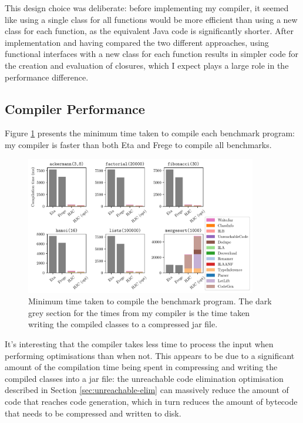 \documentclass[dissertation.tex]{subfiles}
\begin{document}
{{        This design choice was deliberate: before implementing my compiler, it seemed like using a single class for all
        functions would be more efficient than using a new class for each function, as the equivalent Java code is
        significantly shorter. After implementation and having compared the two different approaches, using functional
        interfaces with a new class for each function results in simpler code for the creation and evaluation of
        closures, which I expect plays a large role in the performance difference.


    }
    \subsection{Compiler Performance}
    {

        Figure \ref{fig:compiler-perf} presents the minimum time taken to compile each benchmark program: my compiler is
        faster than both Eta and Frege to compile all benchmarks.
        
        \begin{figure}[h]
            \centering
            \captionsetup{width=0.8\textwidth}
            \includegraphics[width=0.9\textwidth]{graphs/compiler_perf.pdf}
            \caption{Minimum time taken to compile the benchmark program. The dark grey section for the times from my compiler is the time taken writing the compiled classes to a compressed jar file.}
            \label{fig:compiler-perf}
        \end{figure}
        
        It's interesting that the compiler takes less time to process the input when performing optimisations than when
        not. This appears to be due to a significant amount of the compilation time being spent in compressing and
        writing the compiled classes into a jar file: the unreachable code elimination optimisation described in Section
        \ref{sec:unreachable-elim} can massively reduce the amount of code that reaches code generation, which in turn
        reduces the amount of bytecode that needs to be compressed and written to disk.

}}
\end{document}
